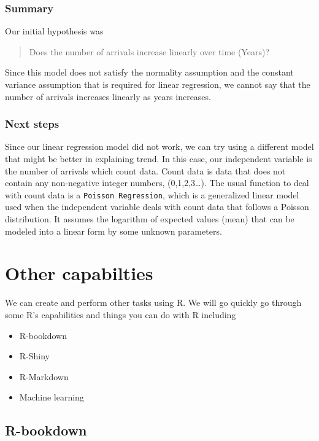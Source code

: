 \documentclass[
]{book}
\begin{document}
\hypertarget{summary}{%
\subsection{Summary}\label{summary}}

Our initial hypothesis was

\begin{quote}
Does the number of arrivals increase linearly over time (Years)?
\end{quote}

Since this model does not satisfy the normality assumption and the constant variance assumption that is required for linear regression, we cannot say that the number of arrivals increases linearly as years increases.

\hypertarget{next-steps}{%
\subsection{Next steps}\label{next-steps}}

Since our linear regression model did not work, we can try using a different model that might be better in explaining trend. In this case, our independent variable is the number of arrivals which count data. Count data is data that does not contain any non-negative integer numbers, (0,1,2,3\ldots). The usual function to deal with count data is a \texttt{Poisson\ Regression}, which is a generalized linear model used when the independent variable deals with count data that follows a Poisson distribution. It assumes the logarithm of expected values (mean) that can be modeled into a linear form by some unknown parameters.

\hypertarget{other-capabilties}{%
\chapter{Other capabilties}\label{other-capabilties}}

We can create and perform other tasks using R. We will go quickly go through some R's capabilities and things you can do with R including

\begin{itemize}
\item
  R-bookdown
\item
  R-Shiny
\item
  R-Markdown
\item
  Machine learning
\end{itemize}

\hypertarget{r-bookdown}{%
\section{R-bookdown}\label{r-bookdown}}
\end{document}
